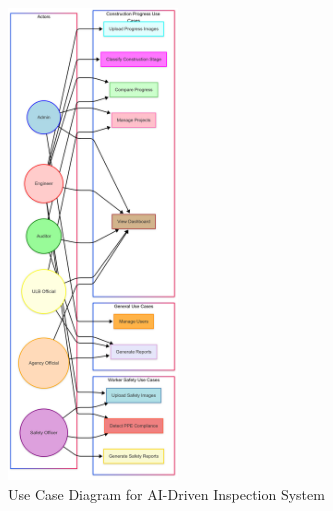\documentclass[12pt,a4paper]{report}
\begin{document}
\begin{figure}[H]
    \centering
    \includegraphics[width=0.4\textwidth]{images/mermaid-ai-diagram-2025-04-27-111841.png}
    \caption{Use Case Diagram for AI-Driven Inspection System}
    \label{fig:use-case-diagram}
\end{figure}
\end{document}
